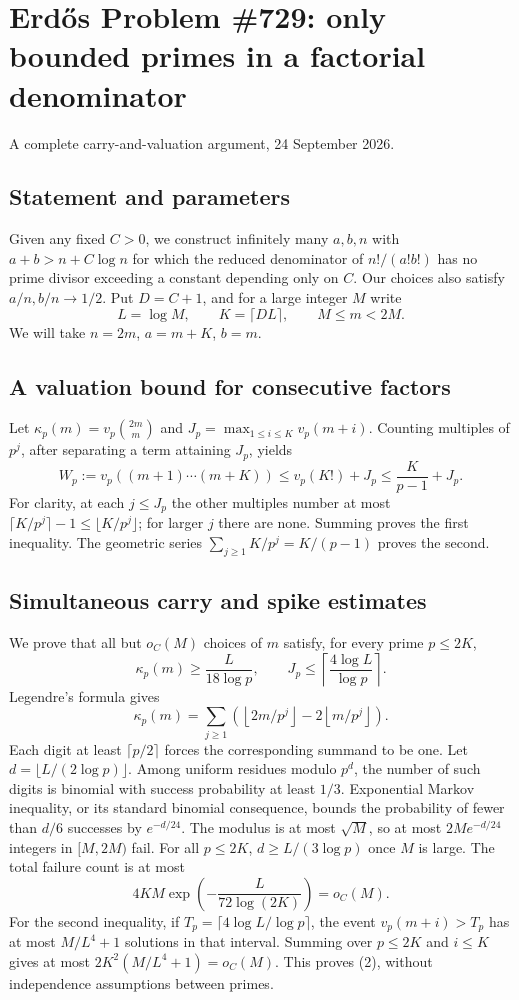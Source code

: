 \section{Erd\H{o}s Problem \#729: only bounded primes in a factorial denominator}
\noindent A complete carry-and-valuation argument, 24 September 2026.

\subsection*{Statement and parameters}
Given any fixed $C>0$, we construct infinitely many $a,b,n$ with
$a+b>n+C\log n$ for which the reduced denominator of $n!/(a!b!)$ has no prime divisor exceeding a constant depending only on $C$. Our choices also satisfy $a/n,b/n\to1/2$.
Put $D=C+1$, and for a large integer $M$ write
\[
 L=\log M,\qquad K=\lceil DL\rceil,\qquad M\leq m<2M.
\]
We will take $n=2m$, $a=m+K$, $b=m$.

\subsection*{A valuation bound for consecutive factors}
Let $\kappa_p(m)=v_p\binom{2m}{m}$ and $J_p=\max_{1\leq i\leq K}v_p(m+i)$. Counting multiples of $p^j$, after separating a term attaining $J_p$, yields
\[
 W_p:=v_p((m+1)\cdots(m+K))
 \leq v_p(K!)+J_p
 \leq\frac K{p-1}+J_p. \tag{1}
\]
For clarity, at each $j\leq J_p$ the other multiples number at most
$\lceil K/p^j\rceil-1\leq\lfloor K/p^j\rfloor$; for larger $j$ there are none. Summing proves the first inequality. The geometric series $\sum_{j\geq1}K/p^j=K/(p-1)$ proves the second.

\subsection*{Simultaneous carry and spike estimates}
We prove that all but $o_C(M)$ choices of $m$ satisfy, for every prime $p\leq2K$,
\[
 \kappa_p(m)\geq\frac L{18\log p},
 \qquad
 J_p\leq\left\lceil\frac{4\log L}{\log p}\right\rceil. \tag{2}
\]
Legendre's formula gives
\[
 \kappa_p(m)=\sum_{j\geq1}
 \left(\left\lfloor2m/p^j\right\rfloor
       -2\left\lfloor m/p^j\right\rfloor\right).
\]
Each digit at least $\lceil p/2\rceil$ forces the corresponding summand to be one.
Let $d=\lfloor L/(2\log p)\rfloor$. Among uniform residues modulo $p^d$, the number of such digits is binomial with success probability at least $1/3$. Exponential Markov inequality, or its standard binomial consequence, bounds the probability of fewer than $d/6$ successes by $e^{-d/24}$.
The modulus is at most $\sqrt M$, so at most $2M e^{-d/24}$ integers in $[M,2M)$ fail. For all $p\leq2K$, $d\geq L/(3\log p)$ once $M$ is large. The total failure count is at most
\[
 4KM\exp\left(-\frac L{72\log(2K)}\right)=o_C(M).
\]
For the second inequality, if $T_p=\lceil4\log L/\log p\rceil$, the event $v_p(m+i)>T_p$ has at most $M/L^4+1$ solutions in that interval. Summing over $p\leq2K$ and $i\leq K$ gives at most
$2K^2(M/L^4+1)=o_C(M)$. This proves (2), without independence assumptions between primes.

